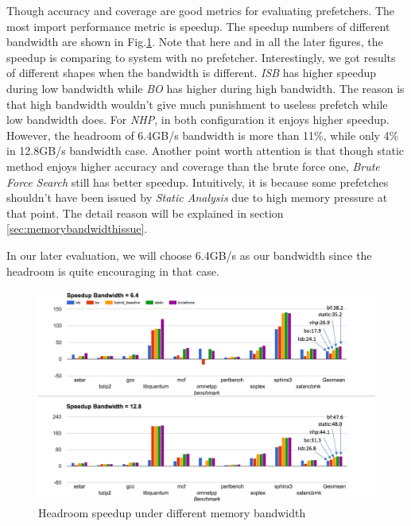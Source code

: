   Though accuracy and coverage are good metrics for evaluating prefetchers. The most import performance metric is speedup. The speedup numbers of different bandwidth are shown in Fig.\ref{fig:headroom_speedup}. Note that here and in all the later figures, the speedup is comparing to system with no prefetcher. Interestingly, we got results of different shapes when the bandwidth is different. \emph{ISB} has higher speedup during low bandwidth while \emph{BO} has higher during high bandwidth. The reason is that high bandwidth wouldn't give much punishment to useless prefetch while low bandwidth does. For \emph{NHP}, in both configuration it enjoys higher speedup. However, the headroom of 6.4GB/s bandwidth is more than 11\%, while only 4\% in 12.8GB/s bandwidth case. Another point worth attention is that though static method enjoys higher accuracy and coverage than the brute force one, \emph{Brute Force Search} still has better speedup. Intuitively, it is because some prefetches shouldn't have been issued by \emph{Static Analysis} due to high memory pressure at that point. The detail reason will be explained in section \ref{sec:memorybandwidthissue}.

  In our later evaluation, we will choose 6.4GB/s as our bandwidth since the headroom is quite encouraging in that case.


  \begin{figure}[ht!]
	   \centering
	   \includegraphics[width=1.0\textwidth]{images/headroom_speedup.png}
	   \caption{Headroom speedup under different memory bandwidth}
	  \label{fig:headroom_speedup}
  \end{figure}

